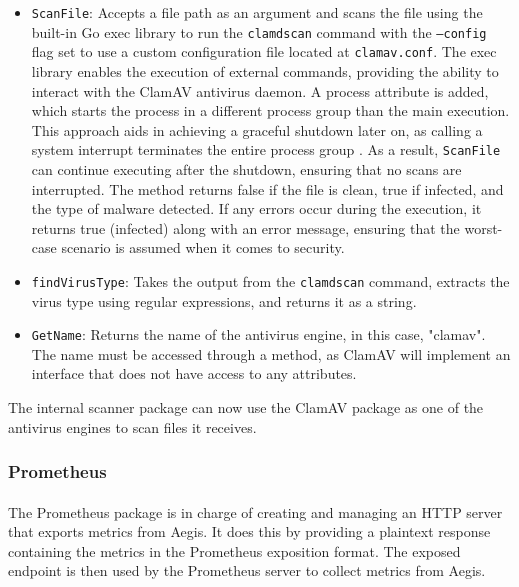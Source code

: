 \documentclass[12pt, conference, final, a4paper, onecolumn, compsoc]{IEEEtran}
\begin{document}
\begin{itemize}
  \item \texttt{ScanFile}: Accepts a file path as an argument and scans the file
        using the built-in Go exec library to run the \texttt{clamdscan} command
        with the \texttt{--config} flag set to use a custom configuration file
        located at \texttt{clamav.conf}. The exec library enables the execution
        of external commands, providing the ability to interact with the ClamAV
        antivirus daemon. A process attribute is added, which starts the process
        in a different process group than the main execution. This approach aids
        in achieving a graceful shutdown later on, as calling a system interrupt
        terminates the entire process group \citep{process-groups}. As a result,
        \texttt{ScanFile} can continue executing after the shutdown, ensuring
        that no scans are interrupted. The method returns false if the file is
        clean, true if infected, and the type of malware detected. If any errors
        occur during the execution, it returns true (infected) along with an
        error message, ensuring that the worst-case scenario is assumed when it
        comes to security.
  \item \texttt{findVirusType}: Takes the output from the \texttt{clamdscan}
        command, extracts the virus type using regular expressions, and returns
        it as a string.
  \item \texttt{GetName}: Returns the name of the antivirus engine, in this
        case, "clamav". The name must be accessed through a method, as ClamAV
        will implement an interface that does not have access to any attributes.
\end{itemize}

The internal scanner package can now use the ClamAV package as one of the
antivirus engines to scan files it receives.

\subsubsection*{Prometheus}
\paragraph{}

The Prometheus package is in charge of creating and managing an HTTP server that
exports metrics from Aegis. It does this by providing a plaintext response
containing the metrics in the Prometheus exposition format. The exposed endpoint
is then used by the Prometheus server to collect metrics from Aegis.
\end{document}
